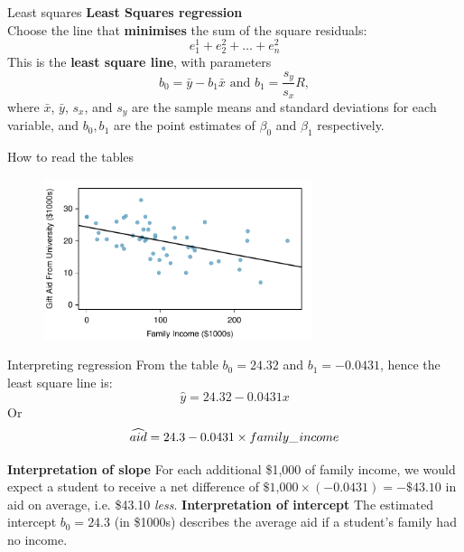 \documentclass[12pt,a4paper]{beamer}
\begin{document}
\begin{frame}{Least squares}
	\textbf{Least Squares regression}\\
	Choose the line that \textbf{minimises} the sum of the square residuals:
	\[e^1_1+e^2_2+\dots+e_n^2\]
	This is the \textbf{least square line}, with parameters
	\[b_0=\bar{y}-b_1\bar{x} \text{ and }b_1 = \frac{s_y}{s_x} R,\]
	where $\bar{x}$, $\bar{y}$, $s_x$, and $s_y$ are the sample means and standard deviations for each variable, and $b_0,b_1$ are the point estimates of $\beta_0$ and $\beta_1$ respectively.
\end{frame}
\begin{frame}{How to read the tables}
	\begin{figure}
	\centering
	\includegraphics[width=0.7\textwidth]{figures/elmhurstPlots/elmhurstScatterWLSROnly}
	\end{figure}
\end{frame}
\begin{frame}{Interpreting regression}
	From the table $b_0=24.32$ and $b_1=-0.0431$, hence the least square line is:
	\[\hat{y} = 24.32 - 0.0431 x\]
	Or
	\[\widehat{aid} = 24.3 - 0.0431 \times family\_\hspace{0.3mm}income\]
	
\small	\textbf{Interpretation of slope} For each additional \$1,000 of family income, we would expect a student to receive a net difference of $\$\text{1,000}\times (-0.0431) = -\$43.10$ in aid on average, i.e. \$43.10 \emph{less}.\vspace{0.3cm}
	\textbf{Interpretation of intercept} The estimated intercept $b_0=24.3$ (in \$1000s) describes the average aid if a student's family had no income. 
\end{frame}
\end{document}

